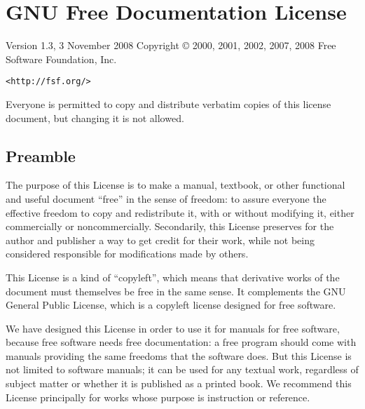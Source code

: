 \documentclass[letterpaper,twoside]{scrartcl}
\begin{document}

 \newpage


 \section{GNU Free Documentation License}
  \label{label_fdl}

  \begin{center}

   Version 1.3, 3 November 2008
   Copyright \copyright{} 2000, 2001, 2002, 2007, 2008  Free Software Foundation, Inc.
	  
   \texttt{<http://fsf.org/>}
  \end{center}	    
	   
    
  Everyone is permitted to copy and distribute verbatim copies
  of this license document, but changing it is not allowed.
      
  \subsection{Preamble}
  

   The purpose of this License is to make a manual, textbook, or other
   functional and useful document ``free'' in the sense of freedom: to
   assure everyone the effective freedom to copy and redistribute it,
   with or without modifying it, either commercially or noncommercially.
   Secondarily, this License preserves for the author and publisher a way
   to get credit for their work, while not being considered responsible
   for modifications made by others.

   This License is a kind of ``copyleft'', which means that derivative
   works of the document must themselves be free in the same sense.  It
   complements the GNU General Public License, which is a copyleft
   license designed for free software.

   We have designed this License in order to use it for manuals for free
   software, because free software needs free documentation: a free
   program should come with manuals providing the same freedoms that the
   software does.  But this License is not limited to software manuals;
   it can be used for any textual work, regardless of subject matter or
   whether it is published as a printed book.  We recommend this License
   principally for works whose purpose is instruction or reference.
\end{document}
